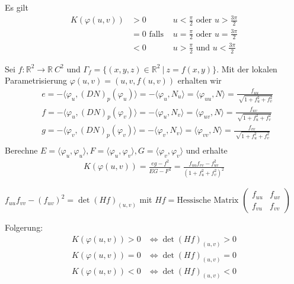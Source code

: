 \documentclass[../main.tex]{subfiles}
\begin{document}
\begin{remark}
    Es gilt \begin{align*}
        K(\varphi(u,v)) &> 0    &u < \frac{\pi}{2} \text{ oder } u>\frac{3\pi}{2}\\
        &=0 \text{ falls } &u = \frac{\pi}{2} \text{ oder } u=\frac{3\pi}{2}\\
        &<0 &u> \frac{\pi}{2} \text{ und } u<\frac{3\pi}{2}
    \end{align*}
\end{remark}
\pagebreak
\begin{application}
    Sei $f:\mathbb{R}^{2}\rightarrow\mathbb{R} \ C^{2}$ und \linebreak $\Gamma_{f}=\{(x,y,z)\in\mathbb{R}^{2} \ \vert \ z=f(x,y)\}$. Mit der lokalen Parametrisierung \linebreak
    $\varphi(u,v) = (u,v,f(u,v))$ erhalten wir \begin{align*}
        &e=-\langle\varphi_{u},(DN)_{p}(\varphi_{u})\rangle = -\langle\varphi_{u},N_{u}\rangle = \langle\varphi_{uu},N\rangle = \frac{f_{uu}}{\sqrt[]{1+f_{u}^{2}+f_{v}^{2}}}\\
        &f=-\langle\varphi_{u},(DN)_{p}(\varphi_{v})\rangle = -\langle\varphi_{u},N_{v}\rangle = \langle\varphi_{uv},N\rangle = \frac{f_{uv}}{\sqrt[]{1+f_{u}^{2}+f_{v}^{2}}}\\
        &g=-\langle\varphi_{v},(DN)_{p}(\varphi_{v})\rangle = -\langle\varphi_{v},N_{v}\rangle = \langle\varphi_{vv},N\rangle = \frac{f_{vv}}{\sqrt[]{1+f_{u}^{2}+f_{v}^{2}}}\\       
    \end{align*}
    Berechne $E=\langle\varphi_{u},\varphi_{u}\rangle,F=\langle\varphi_{u},\varphi_{v}\rangle,G=\langle\varphi_{v},\varphi_{v}\rangle$ und erhalte \begin{align*}
        K(\varphi(u,v)) = \frac{eg-f^{2}}{EG-F^{2}} = \frac{f_{uu}f_{vv}-f_{uv}^{2}}{(1+f_{u}^{2}+f_{v}^{2})^{2}}
    \end{align*}
\end{application}
\begin{remark}
    $f_{uu} f_{vv} - (f_{uv})^{2} = \det(Hf)_{(u,v)}$ mit $Hf = \text{Hessische Matrix }\begin{pmatrix}
        f_{uu} & f_{uv} \\ f_{vu} & f_{vv}
    \end{pmatrix}$
\end{remark}
\noindent Folgerung: \begin{align*}
    K(\varphi(u,v)) > 0 &\iff \det(Hf)_{(u,v)}>0\\
    K(\varphi(u,v)) = 0 &\iff \det(Hf)_{(u,v)}=0\\
    K(\varphi(u,v)) < 0 &\iff \det(Hf)_{(u,v)}<0
\end{align*}
\end{document}

